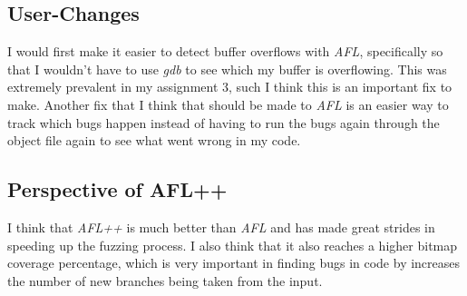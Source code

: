 \documentclass[11pt]{article}
\begin{document}
\subsection{User-Changes}
I would first make it easier to detect buffer overflows with \textit{AFL}, specifically so that I wouldn't have to use \textit{gdb} to see which my buffer is overflowing. This was extremely prevalent in my assignment 3, such I think this is an important fix to make. Another fix that I think that should be made to \textit{AFL} is an easier way to track which bugs happen instead of having to run the bugs again through the object file again to see what went wrong in my code. 

\subsection{Perspective of AFL++}
I think that \textit{AFL++} is much better than \textit{AFL} and has made great strides in speeding up the fuzzing process. I also think that it also reaches a higher bitmap coverage percentage, which is very important in finding bugs in code by increases the number of new branches being taken from the input. 
\end{document}
